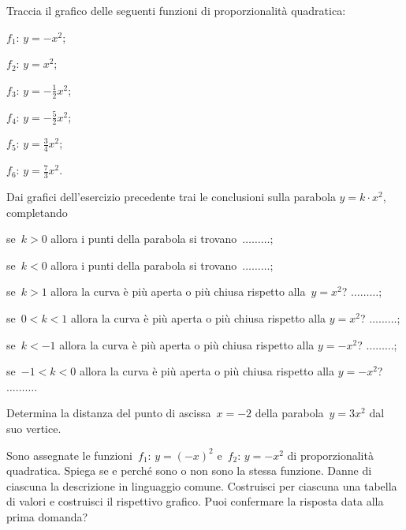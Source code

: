 \begin{esercizio}
\label{ese:8.55}
Traccia il grafico delle seguenti funzioni di proporzionalità quadratica:
\begin{multicols}{3}
 \begin{enumeratea}
\item $f_{1}:\, y=-x^{2}$;
\item $f_{2}:\, y=x^{2}$;
\item $f_{3}:\, y=-{\frac{1}{2}}x^{2}$;
\item $f_{4}:\, y=-{\frac{5}{2}}x^{2}$;
\item $f_{5}:\, y=\frac{3}{4}x^{2}$;
\item $f_{6}:\, y=\frac{7}{3}x^{2}$.
\end{enumeratea}
\end{multicols}
\end{esercizio}
\pagebreak
\begin{esercizio}
\label{ese:8.56}
Dai grafici dell'esercizio precedente trai le conclusioni sulla parabola $y=k\cdot x^2$, completando

\begin{enumeratea}
\item se~$k>0$ allora i punti della parabola si trovano~$\ldots \ldots \ldots$;
\item se~$k<0$ allora i punti della parabola si trovano~$\ldots \ldots \ldots$;
\item se~$k>1$ allora la curva è più aperta o più chiusa rispetto alla~$y=x^{2}$? $\ldots \ldots \ldots$;
\item se~$0<k<1$ allora la curva è più aperta o più chiusa rispetto alla  $y=x^{2}$? $\ldots \ldots \ldots$;
\item se~$k<-1$ allora la curva è più aperta o più chiusa rispetto alla  $y=-x^{2}$? $\ldots \ldots \ldots$;
\item se~$-1<k<0$ allora la curva è più aperta o più chiusa rispetto alla  $y=-x^{2}$? $\ldots \ldots \ldots$.
\end{enumeratea}
\end{esercizio}

\begin{esercizio}
\label{ese:8.57}
Determina la distanza del punto di ascissa~$x=-2$ della parabola~$y=3x^{2}$ dal suo vertice.
\end{esercizio}

\begin{esercizio}
\label{ese:8.58}
Sono assegnate le funzioni~$f_{1}:\, y=(-x)^{2}$ e~$f_{2}:\, y=-x^{2}$ di proporzionalità quadratica.
Spiega se e perché sono o non sono la stessa funzione.
Danne di ciascuna la descrizione in linguaggio comune.
Costruisci per ciascuna una tabella di valori e costruisci il rispettivo grafico.
Puoi confermare la risposta data alla prima domanda?
\end{esercizio}

